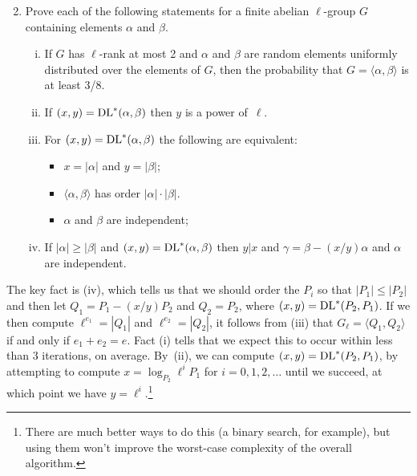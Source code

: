 \documentclass[11pt]{article}
\newcommand{\DL}{{\rm DL}^*}
\theoremstyle{definition}
\begin{document}
\begin{enumerate}[{\bf (a)}]
\setcounter{enumi}{1}
\item Prove each of the following statements for a finite abelian $\ell$-group $G$ containing elements $\alpha$ and $\beta$.
\begin{enumerate}[(i)]
\item If $G$ has $\ell$-rank at most 2 and $\alpha$ and $\beta$ are random elements uniformly distributed over the elements of $G$, then the probability that $G=\langle \alpha,\beta\rangle$ is at least 3/8.
\item If $(x,y)=\DL(\alpha,\beta)$ then $y$ is a power of~$\ell$.

\item For $(x,y)=\DL(\alpha,\beta)$ the following are equivalent:
\begin{itemize}
\item $x=|\alpha|$ and $y=|\beta|$;
\item $\langle\alpha,\beta\rangle$ has order $|\alpha|\cdot|\beta|$.
\item $\alpha$ and $\beta$ are independent;
\end{itemize}
\item If $|\alpha|\ge|\beta|$ and $(x,y)=\DL(\alpha,\beta)$ then $y|x$ and $\gamma=\beta-(x/y)\alpha$ and $\alpha$ are independent.
\end{enumerate}
\end{enumerate}

The key fact is (iv), which tells us that we should order the $P_i$ so that $|P_1|\le |P_2|$ and then let $Q_1=P_1-(x/y)P_2$ and $Q_2=P_2$, where $(x,y)=\DL(P_2,P_1)$.  If we then compute $\ell^{e_1}=|Q_1|$ and $\ell^{e_2}=|Q_2|$, it follows from (iii) that $G_\ell=\langle Q_1,Q_2\rangle$ if and only if $e_1+e_2=e$.  Fact (i) tells that we expect this to occur within less than 3 iterations, on average.
By~(ii), we can compute $(x,y)=\DL(P_2,P_1)$, by attempting to compute $x=\log_{P_2}\ell^iP_1$ for $i=0,1,2,\ldots$ until we succeed, at which point we have $y=\ell^i$.\footnote{There are much better ways to do this (a binary search, for example), but using them won't improve the worst-case complexity of the overall algorithm.}
\end{document}

